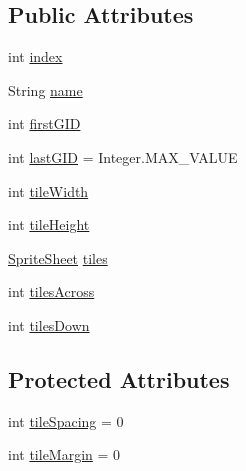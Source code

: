 \subsection*{Public Attributes}
\begin{DoxyCompactItemize}
\item 
int \mbox{\hyperlink{classorg_1_1newdawn_1_1slick_1_1tiled_1_1_tile_set_a1b4900ec472556e1e3af0d8f96d9b94a}{index}}
\item 
String \mbox{\hyperlink{classorg_1_1newdawn_1_1slick_1_1tiled_1_1_tile_set_ac0de29bb9eb37a2c57db969aab877e49}{name}}
\item 
int \mbox{\hyperlink{classorg_1_1newdawn_1_1slick_1_1tiled_1_1_tile_set_a7c27767efccd6a3a68dfa519251fbec1}{first\+G\+ID}}
\item 
int \mbox{\hyperlink{classorg_1_1newdawn_1_1slick_1_1tiled_1_1_tile_set_a828b4b9fe91730b4e4e24b6f3f443b1b}{last\+G\+ID}} = Integer.\+M\+A\+X\+\_\+\+V\+A\+L\+UE
\item 
int \mbox{\hyperlink{classorg_1_1newdawn_1_1slick_1_1tiled_1_1_tile_set_a12995a46982fc8ddc47b517dc500e376}{tile\+Width}}
\item 
int \mbox{\hyperlink{classorg_1_1newdawn_1_1slick_1_1tiled_1_1_tile_set_aeecbe9c64da988364b3513c4eaa231c2}{tile\+Height}}
\item 
\mbox{\hyperlink{classorg_1_1newdawn_1_1slick_1_1_sprite_sheet}{Sprite\+Sheet}} \mbox{\hyperlink{classorg_1_1newdawn_1_1slick_1_1tiled_1_1_tile_set_aef351a8396d7a309b80115d07ebdbeed}{tiles}}
\item 
int \mbox{\hyperlink{classorg_1_1newdawn_1_1slick_1_1tiled_1_1_tile_set_ab3ffc33b31696152babe6729b445c0dd}{tiles\+Across}}
\item 
int \mbox{\hyperlink{classorg_1_1newdawn_1_1slick_1_1tiled_1_1_tile_set_a0b8149c521782ff93aedacf0e3922d68}{tiles\+Down}}
\end{DoxyCompactItemize}
\subsection*{Protected Attributes}
\begin{DoxyCompactItemize}
\item 
int \mbox{\hyperlink{classorg_1_1newdawn_1_1slick_1_1tiled_1_1_tile_set_a0f7faa748f39e0211e7d56bb5f1088c8}{tile\+Spacing}} = 0
\item 
int \mbox{\hyperlink{classorg_1_1newdawn_1_1slick_1_1tiled_1_1_tile_set_a2d51fd9dbb8548f1a885f47885ec0a32}{tile\+Margin}} = 0
\end{DoxyCompactItemize}

